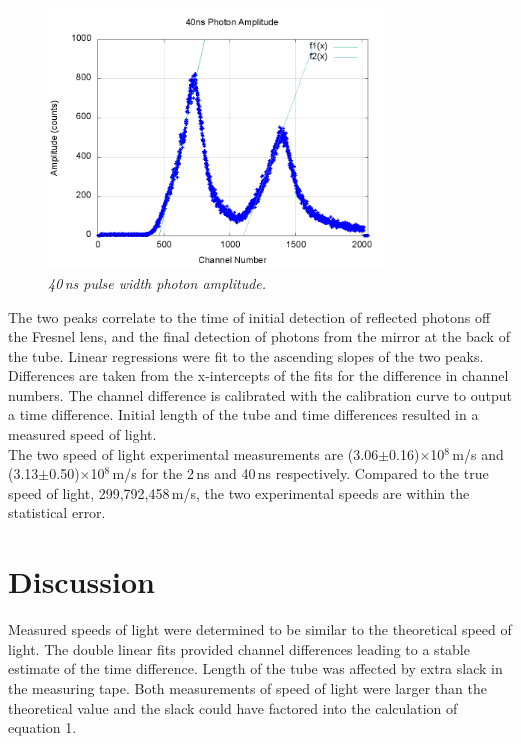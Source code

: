 \documentclass[aps,prl,twocolumn,superscriptaddress]{revtex4-1}
\begin{document}
\begin{figure}[h!]
  \begin{center}
\centerline{\includegraphics[width=3.5in]{solgraph40.png}}
\caption{\it \small{40\,ns pulse width photon amplitude. \label{fig1}}}
  \end{center}
\end{figure}

The two peaks correlate to the time of initial detection of reflected photons off the Fresnel lens, and the final detection of photons from the mirror at the back of the tube. Linear regressions were fit to the ascending slopes of the two peaks. Differences are taken from the x-intercepts of the fits for the difference in channel numbers. The channel difference is calibrated with the calibration curve to output a time difference. Initial length of the tube and time differences resulted in a measured speed of light.
\\
\indent The two speed of light experimental measurements are (3.06$\pm$0.16)$\times$10$^8$\,m/s and (3.13$\pm$0.50)$\times$10$^8$\,m/s for the 2\,ns and 40\,ns respectively. Compared to the true speed of light, 299,792,458\,m/s, the two experimental speeds are within the statistical error.


\section{Discussion}

Measured speeds of light were determined to be similar to the theoretical speed of light. The double linear fits provided channel differences leading to a stable estimate of the time difference. Length of the tube was affected by extra slack in the measuring tape. Both measurements of speed of light were larger than the theoretical value and the slack could have factored into the calculation of equation 1.
\end{document}
